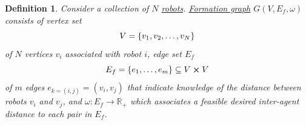 \documentclass[]{article}
\numberwithin{equation}{section}
\newcommand{\R}{\mathbb{R}}
\newtheorem{definition}{Definition}
\begin{document}








\begin{definition} \label{def:form_graph_def}
    Consider a collection of $N$ \underline{\emph{robots}}.
    \emph{\underline{Formation graph}} $G(V, E_f, \omega)$ consists of vertex set \[
        V = \qty{v_1,v_2,\dots,v_N}
    \] of $N$ vertices $v_i$ associated with robot $i$, edge set $E_f$\[
        E_f = \qty{e_1, \dots, e_m} \subseteq V \cross V
    \] of $m$ edges $e_{k=(i,j)} = (v_i,v_j)$ that indicate knowledge of the distance between robots $v_i$ and $v_j$, 
    and $\omega : E_f \to \R_{+}$ which associates a feasible desired inter-agent distance to each pair in $E_f$.
\end{definition}
\end{document}
